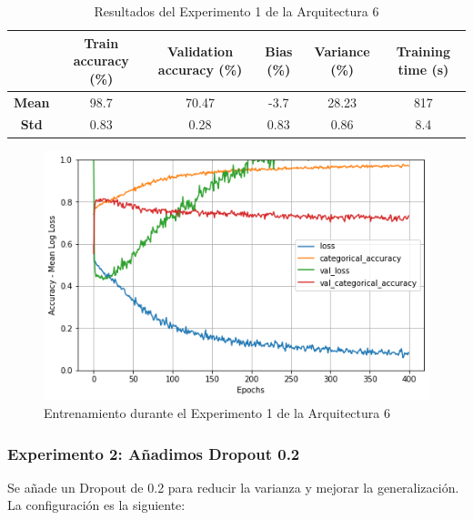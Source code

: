 \documentclass{article}
\begin{document}
            \begin{table}[!h]
				\begin{center}
					\begin{tabular}{ c | c | c | c | c | c |}
						\ & \textbf{Train accuracy (\%)} & \textbf{Validation accuracy (\%)} & \textbf{Bias (\%)} & \textbf{Variance (\%)} & \textbf{Training time (s)} \\ \hline
						\textbf{Mean} & 98.7 & 70.47 & -3.7  & 28.23 & 817   \\ \hline
						\textbf{Std} &  0.83 & 0.28 &  0.83 & 0.86 & 8.4  \\ \hline
					\end{tabular}
					\caption{Resultados del Experimento 1 de la Arquitectura 6}
					\label{tab:res-a2-e5}
				\end{center}
			\end{table}
            
            \begin{figure}[!h]
				\begin{center}
					\includegraphics[scale=0.5]{tr-a6-e1.png}		
					\caption{Entrenamiento durante el Experimento 1 de la Arquitectura 6}	
					\label{tab:tr-a6-e1}
				\end{center}
			\end{figure}
   
        \subsubsection{Experimento 2: A\~{n}adimos Dropout 0.2}
        \label{s-a6-e2}
            Se a\~{n}ade un Dropout de 0.2 para reducir la varianza y mejorar la generalizaci\'on. La configuraci\'on es la siguiente: 
   
\end{document}
